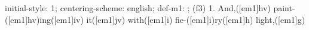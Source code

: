 initial-style: 1;
centering-scheme: english;
def-m1: \grealign;
(f3) 1. And,([em1]hv) paint-([em1]hv)ing([em1]iv) it([em1]jv) with([em1]i) fie-([em1]i)ry([em1]h) light,([em1]g)